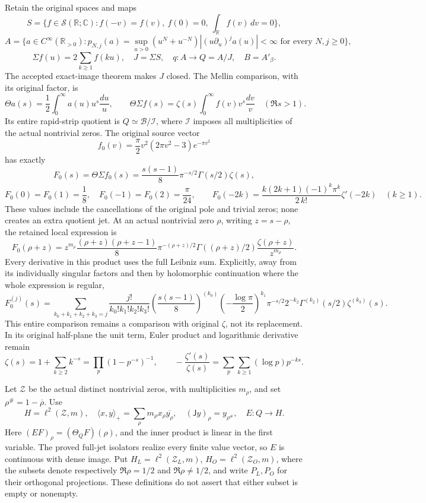 Retain the original spaces and maps \[
S=\{f\in\mathcal S(\mathbb R;\mathbb C):f(-v)=f(v),\ f(0)=0,
\ \int_{\mathbb R}f(v)\,dv=0\},
\] \[
A=\{a\in C^\infty(\mathbb R_{>0}):
p_{N,j}(a)=\sup_{u>0}(u^N+u^{-N})|(u\partial_u)^ja(u)|<\infty
\text{ for every }N,j\ge0\},
\] \[
\Sigma f(u)=2\sum_{k\ge1}f(ku),\quad J=\Sigma S,
\quad q:A\to Q=A/J,\quad B=A'_\beta.
\tag{AST1.1}
\] The accepted exact-image theorem makes \(J\) closed. The Mellin
comparison, with its original factor, is \[
\Theta a(s)=\frac12\int_0^\infty a(u)u^s\frac{du}{u},\qquad
\Theta\Sigma f(s)=\zeta(s)\int_0^\infty f(v)v^s\frac{dv}{v}
\quad(\Re s>1).
\tag{AST1.2}
\] Its entire rapid-strip quotient is \(Q\simeq\mathcal B/\mathcal I\),
where \(\mathcal I\) imposes all multiplicities of the actual nontrivial
zeros. The original source vector \[
f_0(v)=\frac\pi2v^2(2\pi v^2-3)e^{-\pi v^2}
\] has exactly \[
F_0(s)=\Theta\Sigma f_0(s)
=\frac{s(s-1)}8\pi^{-s/2}\Gamma(s/2)\zeta(s),
\] \[
F_0(0)=F_0(1)=\frac18,\quad F_0(-1)=F_0(2)=\frac\pi{24},\qquad
F_0(-2k)=\frac{k(2k+1)(-1)^k\pi^k}{2\,k!}\zeta'(-2k)
\quad(k\ge1).
\tag{AST1.3}
\] These values include the cancellations of the original pole and
trivial zeros; none creates an extra quotient jet. At an actual
nontrivial zero \(\rho\), writing \(z=s-\rho\), the retained local
expression is \[
F_0(\rho+z)=z^{m_\rho}
\frac{(\rho+z)(\rho+z-1)}8\pi^{-(\rho+z)/2}
\Gamma((\rho+z)/2)\frac{\zeta(\rho+z)}{z^{m_\rho}}.
\tag{AST1.4}
\] Every derivative in this product uses the full Leibniz sum.
Explicitly, away from its individually singular factors and then by
holomorphic continuation where the whole expression is regular, \[
F_0^{(j)}(s)=\sum_{k_0+k_1+k_2+k_3=j}
\frac{j!}{k_0!k_1!k_2!k_3!}
\left(\frac{s(s-1)}8\right)^{(k_0)}
\left(-\frac{\log\pi}{2}\right)^{k_1}\pi^{-s/2}
2^{-k_2}\Gamma^{(k_2)}(s/2)\zeta^{(k_3)}(s).
\tag{AST1.5}
\] This entire comparison remains a comparison with original \(\zeta\),
not its replacement. In its original half-plane the unit term, Euler
product and logarithmic derivative remain \[
\zeta(s)=1+\sum_{k\ge2}k^{-s}=\prod_p(1-p^{-s})^{-1},\qquad
-\frac{\zeta'(s)}{\zeta(s)}=\sum_p\sum_{k\ge1}(\log p)p^{-ks}.
\tag{AST1.6}
\]

Let \(\mathscr Z\) be the actual distinct nontrivial zeros, with
multiplicities \(m_\rho\), and set \(\rho^\#=1-\overline\rho\). Use \[
H=\ell^2(\mathscr Z,m),\quad
\langle x,y\rangle_+=\sum_\rho m_\rho x_\rho\overline{y_\rho},
\quad (\mathsf Jy)_\rho=y_{\rho^\#},\quad E:Q\to H.
\tag{AST1.7}
\] Here \((EF)_\rho=(\Theta_QF)(\rho)\), and the inner product is linear
in the first variable. The proved full-jet isolators realize every
finite value vector, so \(E\) is continuous with dense image. Put
\(H_L=\ell^2(\mathscr Z_L,m)\), \(H_O=\ell^2(\mathscr Z_O,m)\), where
the subsets denote respectively \(\Re\rho=1/2\) and \(\Re\rho\ne1/2\),
and write \(P_L,P_O\) for their orthogonal projections. These
definitions do not assert that either subset is empty or nonempty.

